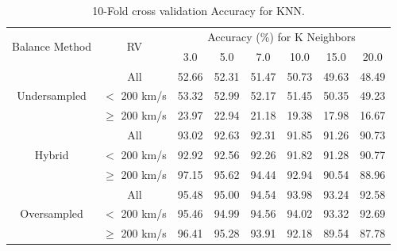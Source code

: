 \documentclass[trackchanges, floatfix, twocolumn, tighten]{aastex62}
\begin{document}
\begin{table}
\centering
\caption{10-Fold cross validation Accuracy for KNN.}
\label{tab:KNND}
	\begin{tabular}{|c|c|c|c|c|c|c|c|}
		\hline
		\multirow{2}{*}{Balance Method} & \multirow{2}{*}{RV} & \multicolumn{6}{c|}{Accuracy (\%) for K Neighbors} \\       
		&  & 3.0 &   5.0 &   7.0 &   10.0 &   15.0 &   20.0 \\ \hline \hline
		 \multirow{3}{*}{Undersampled}& All & 52.66 & 52.31 & 51.47 &  50.73 &  49.63 &  48.49 \\ \cline{2-8}
		& $<$ 200 km/s	& 53.32 & 52.99 & 52.17 &  51.45 &  50.35 &  49.23 \\ \cline{2-8}
		& $\geq$ 200 km/s	& 23.97 & 22.94 & 21.18 &  19.38 &  17.98 &  16.67 \\ \hline \hline
		 \multirow{3}{*}{Hybrid}      & All & 93.02 & 92.63 & 92.31 &  91.85 &  91.26 &  90.73 \\ \cline{2-8}
		& $<$ 200 km/s	& 92.92 & 92.56 & 92.26 &  91.82 &  91.28 &  90.77 \\ \cline{2-8}
		& $\geq$ 200 km/s	& 97.15 & 95.62 & 94.44 &  92.94 &  90.54 &  88.96 \\ \hline \hline
		 \multirow{3}{*}{Oversampled} & All & 95.48 & 95.00 & 94.54 &  93.98 &  93.24 &  92.58 \\ \cline{2-8}
		& $<$ 200 km/s& 95.46 & 94.99 & 94.56 &  94.02 &  93.32 &  92.69 \\ \cline{2-8}
		& $\geq$ 200 km/s	& 96.41 & 95.28 & 93.91 &  92.18 &  89.54 &  87.78 \\ \hline
	\end{tabular}
\end{table}
\end{document}

